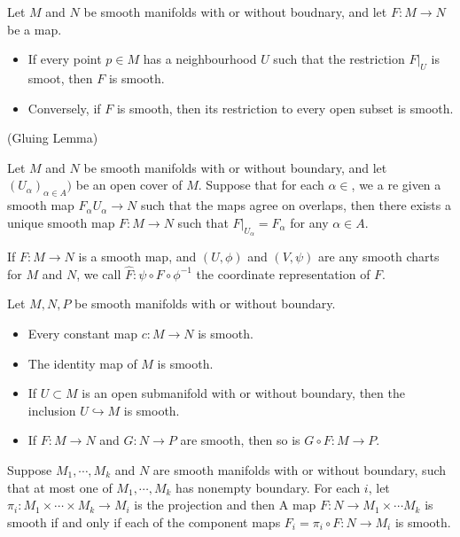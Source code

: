 \begin{proposition}
    Let $M$ and $N$ be smooth manifolds with or without boudnary, and let $F:M\to N$ be a map.\par
    \begin{itemize}
        \item If every point $p\in M$ has a neighbourhood $U$ such that the restriction $F|_U$ is smoot, then $F$ is smooth.\par
        \item Conversely, if $F$ is smooth, then its restriction to every open subset is smooth.
    \end{itemize}
\end{proposition}

\begin{corollary}(Gluing Lemma)\par
    Let $M$ and $N$ be smooth manifolds with or without boundary, and let $(U_{\alpha})_{\alpha \in A})$ be an open cover of $M$. Suppose that for each $\alpha \in $, we a re given a smooth map $F_{\alpha} U_{\alpha} \to N$ such that the maps agree on overlaps, then there exists a unique smooth map $F:M\to N$ such that $F|_{U_{\alpha}} = F_{\alpha}$ for any $\alpha\in A$.
\end{corollary}

\begin{definition}
    If $F:M\to N$ is a smooth map, and $(U,\phi)$ and $(V,\psi)$ are any smooth charts for $M$ and $N$, we call $\hat{F}:\psi \circ F\circ \phi^{-1}$ the coordinate representation of $F$.
\end{definition}

\begin{proposition}
    Let $M,N,P$ be smooth manifolds with or without boundary.
    \begin{itemize}
        \item Every constant map $c:M\to N$ is smooth.
        \item The identity map of $M$ is smooth.
        \item If $U\subset M$ is an open submanifold with or without boundary, then the inclusion $U\hookrightarrow M$ is smooth.
        \item If $F:M\to N$ and $G:N\to P$ are smooth, then so is $G\circ F:M\to P$.
    \end{itemize}
\end{proposition}

\begin{proposition}
    Suppose $M_1,\cdots,M_k$ and $N$ are smooth manifolds with or without boundary, such that at most one of $M_1,\cdots,M_k$ has nonempty boundary. For each $i$, let $\pi_i:M_1\times\cdots\times M_k \to M_i$ is the projection and then A map $F:N\to M_1\times\cdots M_k$ is smooth if and only if each of the component maps $F_i = \pi_i \circ F:N\to M_i$ is smooth.
\end{proposition}

